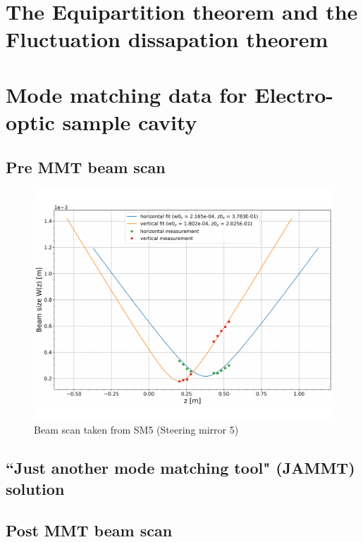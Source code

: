 
\section{The Equipartition theorem and the Fluctuation dissapation theorem}

\newpage




\section{Mode matching data for Electro-optic sample cavity}
\subsection{Pre MMT beam scan}

\begin{figure}[H]
\includegraphics[width=\textwidth]{figs/ALGAAS/beam_scans/12_18_2020_preMMT.pdf}
\caption{Beam scan taken from SM5 (Steering mirror 5)}
\label{fig:beam_scan_2020}
\end{figure}


\subsection{``Just another mode matching tool" (JAMMT) solution}

\subsection{Post MMT beam scan}

